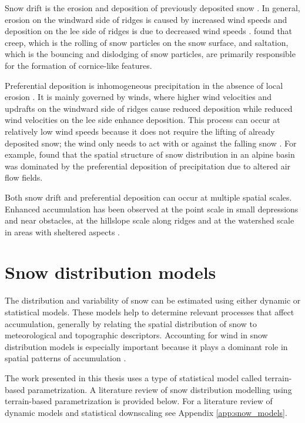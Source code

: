 \documentclass{sfuthesis}
\begin{document}
Snow drift is the erosion and deposition of previously deposited snow \citep{Dadic2010}. In general, erosion on the windward side of ridges is caused by increased wind speeds and deposition on the lee side of ridges is due to decreased wind speeds \citep{Liston1998, Mott2008, Dadic2010}. \cite{Mott2010} found that creep, which is the rolling of snow particles on the snow surface, and saltation, which is the bouncing and dislodging of snow particles, are primarily responsible for the formation of cornice-like features. 

Preferential deposition is inhomogeneous precipitation in the absence of local erosion \citep{Lehning2008}. It is mainly governed by winds, where higher wind velocities and updrafts on the windward side of ridges cause reduced deposition while reduced wind velocities on the lee side enhance deposition. This process can occur at relatively low wind speeds because it does not require the lifting of already deposited snow; the wind only needs to act with or against the falling snow \citep{Mott2008, Dadic2010}. For example, \cite{Mott2011} found that the spatial structure of snow distribution in an alpine basin was dominated by the preferential deposition of precipitation due to altered air flow fields. 

Both snow drift and preferential deposition can occur at multiple spatial scales. Enhanced accumulation has been observed at the point scale in small depressions and near obstacles, at the hillslope scale along ridges and at the watershed scale in areas with sheltered aspects \citep{Harrison1986, Bloeschl1992, Mott2008, Winstral2002, Clark2011}. 

\section{Snow distribution models}

The distribution and variability of snow can be estimated using either dynamic or statistical models. These models help to determine relevant processes that affect accumulation, generally by relating the spatial distribution of snow to meteorological and topographic descriptors. Accounting for wind in snow distribution models is especially important because it plays a dominant role in spatial patterns of accumulation \citep{Winstral2013}. 

The work presented in this thesis uses a type of statistical model called terrain-based parametrization. A literature review of snow distribution modelling using terrain-based parametrization is provided below. For a literature review of dynamic models and statistical downscaling see Appendix \ref{app:snow_models}. 
\end{document}
